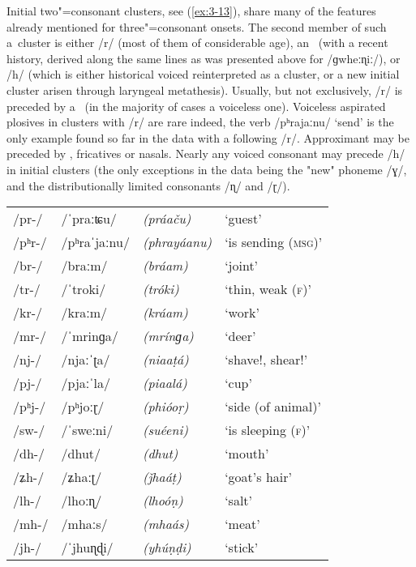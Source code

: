 Initial two"=consonant clusters, see (\ref{ex:3-13}), share many of the features already mentioned for three"=consonant onsets. The second member of such a~cluster is either /r/ (most of them of considerable age), an~ (with a recent history, derived along the same lines as was presented above for /ɡwheːɳiː/), or /h/ (which is either historical voiced  reinterpreted as a cluster, or a new initial cluster arisen through laryngeal metathesis). Usually, but not exclusively, /r/ is preceded by a~ (in the majority of cases a voiceless one). Voiceless aspirated plosives in clusters with /r/ are rare indeed, the verb /pʰrajaːnu/ `send' is the only example found so far in the data with a following /r/. Approximant may be preceded by , fricatives or nasals. Nearly any voiced consonant may precede /h/ in initial clusters (the only exceptions in the data being the "new" phoneme /ɣ/, and the distributionally limited consonants /ɳ/ and /ɽ/).


\begin{exe}
\extab
\label{ex:3-13}
\begin{tabular}{ l l l l }
/pr-/ &
/ˈpraːʨu/ &
\textit{(práaču)} &
`guest'\\
/pʰr-/ &
/pʰraˈjaːnu/ &
\textit{(phrayáanu)} &
`is sending (\textsc{msg)}'\\
/br-/ &
/braːm/ &
\textit{(bráam)} &
`joint'\\
/tr-/ &
/ˈtroki/ &
\textit{(tróki)} &
`thin, weak (\textsc{f)}'\\
/kr-/ &
/kraːm/ &
\textit{(kráam)} &
`work' \\
/mr-/ &
/ˈmrinɡa/ &
\textit{(mrínɡa)} &
`deer'\\
/nj-/ &
/njaːˈʈa/ &
\textit{(niaaṭá)} &
`shave!, shear!' \\
/pj-/ &
/pjaːˈla/ &
\textit{(piaalá)} &
`cup'\\
/pʰj-/ &
/pʰjoːɽ/ &
\textit{(phióoṛ)} &
`side (of animal)' \\
/sw-/ &
/ˈsweːni/ &
\textit{(suéeni) } &
`is sleeping (\textsc{f)}'\\
/dh-/ &
/dhut/ &
\textit{(dhut)} &
`mouth'\\
/ʑh-/ &
/ʑhaːʈ/ &
\textit{(ǰhaáṭ)} &
`goat's hair'\\
/lh-/ &
/lhoːɳ/ &
\textit{(lhoóṇ) } &
`salt'\\
/mh-/ &
/mhaːs/ &
\textit{(mhaás)} &
`meat'\\
/jh-/ &
/ˈjhuɳɖi/ &
\textit{(yhúṇḍi)} &
`stick'\\
\end{tabular}
\end{exe}


